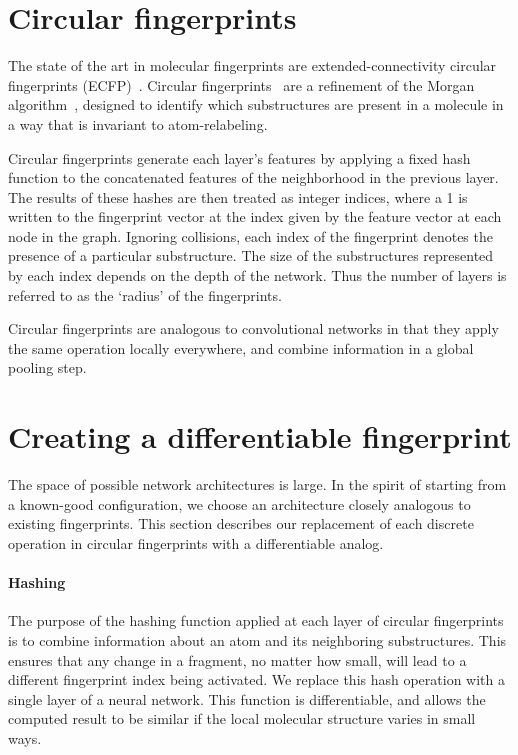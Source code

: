 \documentclass{article}
\begin{document}
\section{Circular fingerprints}
The state of the art in molecular fingerprints are extended-connectivity circular fingerprints (ECFP)~\citep{ECFP2010}.
Circular fingerprints~\citep{glem2006circular} are a refinement of the Morgan algorithm~\citep{morgan1965generation}, designed to identify which substructures are present in a molecule in a way that is invariant to atom-relabeling.

Circular fingerprints generate each layer's features by applying a fixed hash function to the concatenated features of the neighborhood in the previous layer.
The results of these hashes are then treated as integer indices, where a 1 is written to the fingerprint vector at the index given by the feature vector at each node in the graph.
Ignoring collisions, each index of the fingerprint denotes the presence of a particular substructure.
The size of the substructures represented by each index depends on the depth of the network.
Thus the number of layers is referred to as the `radius' of the fingerprints.


Circular fingerprints are analogous to convolutional networks in that they apply the same operation locally everywhere,  and combine information in a global pooling step.

\section{Creating a differentiable fingerprint}
The space of possible network architectures is large.
In the spirit of starting from a known-good configuration, we choose an architecture closely analogous to existing fingerprints.
This section describes our replacement of each discrete operation in circular fingerprints with a differentiable analog.

\paragraph{Hashing}
The purpose of the hashing function applied at each layer of circular fingerprints is to combine information about an atom and its neighboring substructures.
This ensures that any change in a fragment, no matter how small, will lead to a different fingerprint index being activated.
We replace this hash operation with a single layer of a neural network.
This function is differentiable, and allows the computed result to be similar if the local molecular structure varies in small ways.
\end{document}
